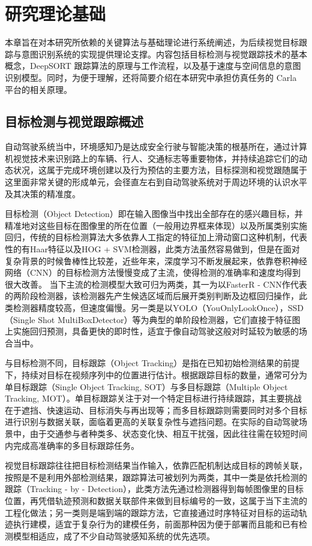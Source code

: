 \chapter{研究理论基础}

本章旨在对本研究所依赖的关键算法与基础理论进行系统阐述，为后续视觉目标跟踪与意图识别系统的实现提供理论支撑。内容包括目标检测与视觉跟踪技术的基本概念，DeepSORT 跟踪算法的原理与工作流程，以及基于速度与空间信息的意图识别模型。同时，为便于理解，还将简要介绍在本研究中承担仿真任务的 Carla 平台的相关原理。

\section{目标检测与视觉跟踪概述}

自动驾驶系统当中，环境感知乃是达成安全行驶与智能决策的根基所在，通过计算机视觉技术来识别路上的车辆、行人、交通标志等重要物体，并持续追踪它们的动态状况，这属于完成环境创建以及行为预估的主要方法，目标探测和视觉跟随属于这里面非常关键的形成单元，会径直左右到自动驾驶系统对于周边环境的认识水平及其决策的精准度。

目标检测（Object Detection）即在输入图像当中找出全部存在的感兴趣目标，并精准地对这些目标在图像里的所在位置（一般用边界框来体现）以及所属类别实施回归，传统的目标检测算法大多依靠人工指定的特征加上滑动窗口这种机制，代表性的有Haar特征以及HOG + SVM检测器，此类方法虽然容易做到，但是在面对复杂背景的时候鲁棒性比较差，近些年来，深度学习不断发展起来，依靠卷积神经网络（CNN）的目标检测方法慢慢变成了主流，使得检测的准确率和速度均得到很大改善。 当下主流的检测模型大致可归为两类，其一为以FasterR - CNN作代表的两阶段检测器，该检测器先产生候选区域而后展开类别判断及边框回归操作，此类检测器精度较高，但速度偏慢。另一类是以YOLO（YouOnlyLookOnce），SSD（Single Shot MultiBoxDetector）等为典型的单阶段检测器，它们直接于特征图上实施回归预测，具备更快的即时性，适宜于像自动驾驶这般对时延较为敏感的场合当中。

与目标检测不同，目标跟踪（Object Tracking）是指在已知初始检测结果的前提下，持续对目标在视频序列中的位置进行估计。根据跟踪目标的数量，通常可分为单目标跟踪（Single Object Tracking, SOT）与多目标跟踪（Multiple Object Tracking, MOT）。单目标跟踪关注于对一个特定目标进行持续跟踪，其主要挑战在于遮挡、快速运动、目标消失与再出现等；而多目标跟踪则需要同时对多个目标进行识别与数据关联，面临着更高的关联复杂性与遮挡问题。在实际的自动驾驶场景中，由于交通参与者种类多、状态变化快、相互干扰强，因此往往需在较短时间内完成高准确率的多目标跟踪任务。

视觉目标跟踪往往把目标检测结果当作输入，依靠匹配机制达成目标的跨帧关联，按照是不是利用外部检测结果，跟踪算法可被划列为两类，其中一类是依托检测的跟踪（Tracking - by - Detection），此类方法先通过检测器得到每帧图像里的目标位置，再凭借轨迹预测和数据关联部件来做到目标编号的一致，这属于当下主流的工程化做法；另一类则是端到端的跟踪方法，它直接通过时序特征对目标的运动轨迹执行建模，适宜于复杂行为的建模任务，前面那种因为便于部署而且能和已有检测模型相适应，成了不少自动驾驶感知系统的优先选项。

